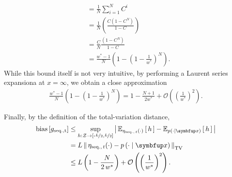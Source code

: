 \begin{proofEnd}
\begin{align}
    &=    \frac{1}{N} \sum_{i=1}^N C^i \\
    &=    \frac{1}{N} \left(\frac{ C \left(1 - C^{N}\right)}{1 - C}\right) \\
    &=    \frac{C}{N} \frac{ \left(1 - C^{N}\right) }{1 - C} \\
    &=  \frac{w^* - 1}{N} \left( 1 - {\left( 1 - \frac{1}{w^*} \right) }^N \right).
  \end{align}
  While this bound itself is not very intuitive, by performing a Laurent series expansiona at \(x = \infty\), we obtain a close approximation
  \begin{align}
    \frac{w^* - 1}{N} \left( 1 - {\left( 1 - \frac{1}{w^*} \right) }^N \right)
    = 1 - \frac{N+1}{2 w^*} + \mathcal{O}\left({\left(\frac{1}{w^*}\right)}^2\right).
  \end{align}

  Finally, by the definition of the total-variation distance, 
 \begin{align}
   \mathrm{bias}\left[ g_{\mathrm{seq., t}} \right]
   &\leq \sup_{h : \mathcal{Z} \rightarrow \left[ \text{-}\nicefrac{L}{2}, \nicefrac{L}{2} \right]} \left|\, \Esub{\eta_{\mathrm{seq.},\, t}(\cdot)}{h} - \Esub{p(\cdot\mid\vx)}{h} \,\right| \\
   &= L \, \DTV{ \eta_{\mathrm{seq.},\, t}(\cdot) }{p\left(\cdot\mid\vx\right)}  \\
   &\leq L \left( 1 - \frac{N}{2 \, w^*} \right) + \mathcal{O}\left({\left(\frac{1}{w^*}\right)}^2\right).
 \end{align}
\end{proofEnd}

